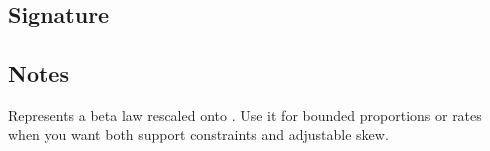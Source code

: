 \documentclass[letterpaper,10pt,english]{sphinxmanual}
\begin{document}
\section{}
\label{\detokenize{object_api_reference:beta}}

\subsection{Signature}
\label{\detokenize{object_api_reference:id55}}
\begin{sphinxVerbatim}[commandchars=\\\{\}]

\end{sphinxVerbatim}


\subsection{Notes}
\label{\detokenize{object_api_reference:id56}}
\sphinxAtStartPar
Represents a beta law rescaled onto . Use it for bounded proportions or rates when you want both support constraints and adjustable skew.
\end{document}

